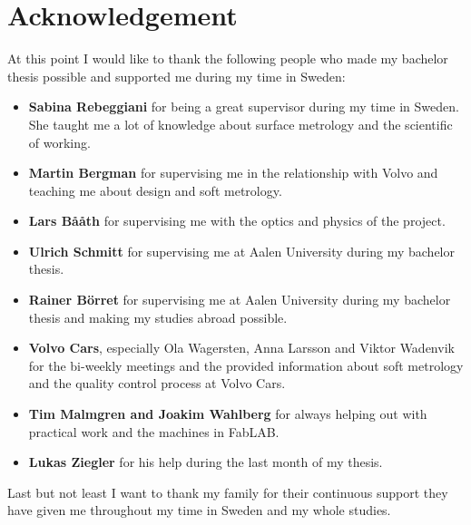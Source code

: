 \chapter*{Acknowledgement}
\label{acknowledgement}
At this point I would like to thank the following people who made my bachelor thesis possible and supported me during my time in Sweden:

\begin{itemize}
\item \textbf{Sabina Rebeggiani} for being a great supervisor during my time in Sweden. She taught me a lot of knowledge about surface metrology and the scientific of working. 
\item \textbf{Martin Bergman} for supervising me in the relationship with Volvo and teaching me about design and soft metrology.
\item \textbf{Lars B\aa \aa th} for supervising me with the optics and physics of the project.
\item \textbf{Ulrich Schmitt} for supervising me at Aalen University during my bachelor thesis.
\item \textbf{Rainer Börret} for supervising me at Aalen University during my bachelor thesis and making my studies abroad possible.
\item \textbf{Volvo Cars}, especially Ola Wagersten, Anna Larsson and Viktor Wadenvik for the bi-weekly meetings and the provided information about soft metrology and the quality control process at Volvo Cars.
\item \textbf{Tim Malmgren and Joakim Wahlberg} for always helping out with practical work and the machines in FabLAB.
\item \textbf{Lukas Ziegler} for his help during the last month of my thesis.
\end{itemize}

Last but not least I want to thank my family for their continuous support they have given me throughout my time in Sweden and my whole studies.